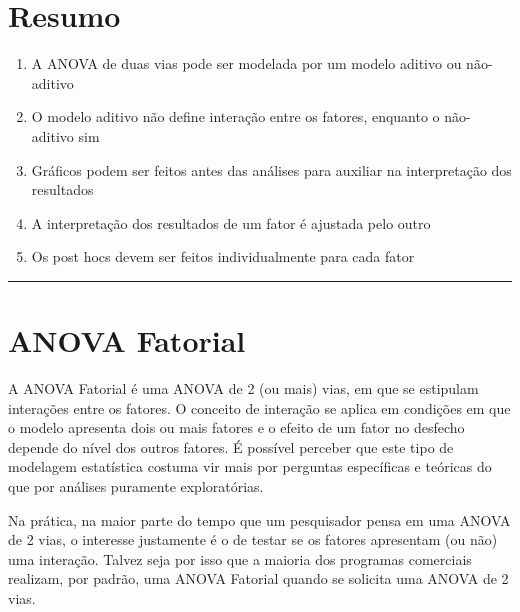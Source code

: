 \documentclass[
]{book}
\providecommand{\tightlist}{%
  \setlength{\itemsep}{0pt}\setlength{\parskip}{0pt}}
\begin{document}
\hypertarget{resumo-7}{%
\section{Resumo}\label{resumo-7}}

\begin{explore}

\begin{enumerate}
\def\labelenumi{\arabic{enumi}.}
\tightlist
\item
  A ANOVA de duas vias pode ser modelada por um modelo aditivo ou
  não-aditivo
\item
  O modelo aditivo não define interação entre os fatores, enquanto o
  não-aditivo sim\\
\item
  Gráficos podem ser feitos antes das análises para auxiliar na
  interpretação dos resultados\\
\item
  A interpretação dos resultados de um fator é ajustada pelo outro\\
\item
  Os post hocs devem ser feitos individualmente para cada fator\\
\end{enumerate}

\end{explore}

\begin{center}\rule{0.5\linewidth}{0.5pt}\end{center}

\hypertarget{anova-fatorial}{%
\section{ANOVA Fatorial}\label{anova-fatorial}}

A ANOVA Fatorial é uma ANOVA de 2 (ou mais) vias, em que se estipulam
interações entre os fatores. O conceito de interação se aplica em
condições em que o modelo apresenta dois ou mais fatores e o efeito de
um fator no desfecho depende do nível dos outros fatores. É possível
perceber que este tipo de modelagem estatística costuma vir mais por
perguntas específicas e teóricas do que por análises puramente
exploratórias.

Na prática, na maior parte do tempo que um pesquisador pensa em uma
ANOVA de 2 vias, o interesse justamente é o de testar se os fatores
apresentam (ou não) uma interação. Talvez seja por isso que a maioria
dos programas comerciais realizam, por padrão, uma ANOVA Fatorial quando
se solicita uma ANOVA de 2 vias.
\end{document}
